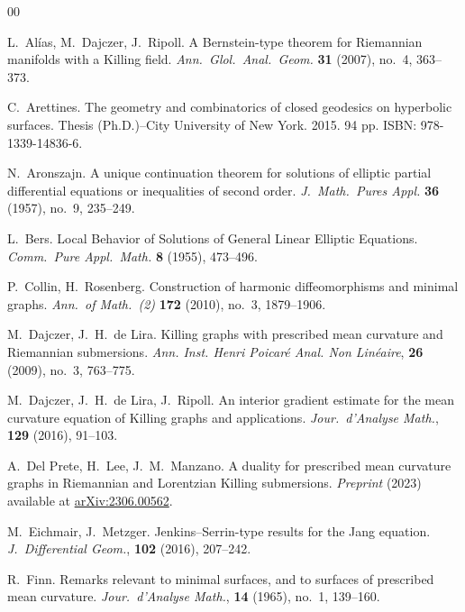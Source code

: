\documentclass[a4paper,10pt,reqno]{amsart}
\theoremstyle{definition}
\theoremstyle{remark}
\numberwithin{equation}{section}
\begin{document}
\begin{thebibliography}{00}
		
	 L.\ Alías, M.\ Dajczer, J.\ Ripoll.
	\newblock A Bernstein-type theorem for Riemannian manifolds with a Killing field.
	\newblock \emph{Ann.\ Glol.\ Anal.\ Geom.} \textbf{31} (2007), no.\ 4, 363--373.

	 C.\ Arettines.
	\newblock The geometry and combinatorics of closed geodesics on hyperbolic surfaces.
	\newblock Thesis (Ph.D.)--City University of New York. 2015. 94 pp. ISBN: 978-1339-14836-6.
		
	 N.\ Aronszajn. 
	\newblock A unique continuation theorem for solutions of elliptic partial differential equations or inequalities of second order. 
	\newblock \emph{J.\ Math.\ Pures Appl.} \textbf{36} (1957), no.\ 9, 235--249.
		
	 L.\ Bers.
	\newblock Local Behavior of Solutions of General Linear Elliptic Equations. 
	\newblock \emph{Comm.\ Pure Appl.\ Math.} \textbf{8} (1955), 473--496.
				
	 P.\ Collin, H.\ Rosenberg.
	\newblock Construction of harmonic diffeomorphisms and minimal graphs.
	\newblock \emph{Ann.\ of Math.\ (2)} \textbf{172} (2010), no.\ 3, 1879--1906.
		
	 M.\ Dajczer, J.\ H.\ de Lira.
	\newblock Killing graphs with prescribed mean curvature and Riemannian submersions.
	\newblock \emph{Ann. Inst. Henri Poicar\'e Anal. Non Lin\'eaire}, \textbf{26} (2009), no.\ 3, 763--775.
			
	 M.\ Dajczer, J.\ H.\ de Lira, J.\ Ripoll.
	\newblock An interior gradient estimate for the mean curvature equation of Killing graphs and applications.
	\newblock \emph{Jour.\ d'Analyse Math.}, \textbf{129} (2016), 91–103.
		
	 A.\ Del Prete, H.\ Lee, J.\ M.\ Manzano.
	\newblock A duality for prescribed mean curvature graphs in Riemannian and Lorentzian Killing submersions.
	\newblock \emph{Preprint} (2023) available at \href{https://arxiv.org/abs/2306.00562}{arXiv:2306.00562}.
		
	 M.\ Eichmair, J.\ Metzger.
	\newblock Jenkins--Serrin-type results for the Jang equation.
	\newblock \emph{J.\ Differential Geom.}, \textbf{102} (2016), 207--242.

		R.\ Finn.
	\newblock Remarks relevant to minimal surfaces, and to surfaces of prescribed mean curvature.
	\newblock \emph{Jour.\ d'Analyse Math.}, \textbf{14} (1965), no.\ 1, 139--160.
		

\end{thebibliography}
\end{document}
